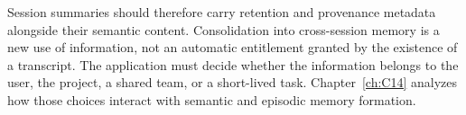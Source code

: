 Session summaries should therefore carry retention and provenance metadata alongside their semantic content. Consolidation into cross-session memory is a new use of information, not an automatic entitlement granted by the existence of a transcript. The application must decide whether the information belongs to the user, the project, a shared team, or a short-lived task. Chapter~\ref{ch:C14} analyzes how those choices interact with semantic and episodic memory formation.

